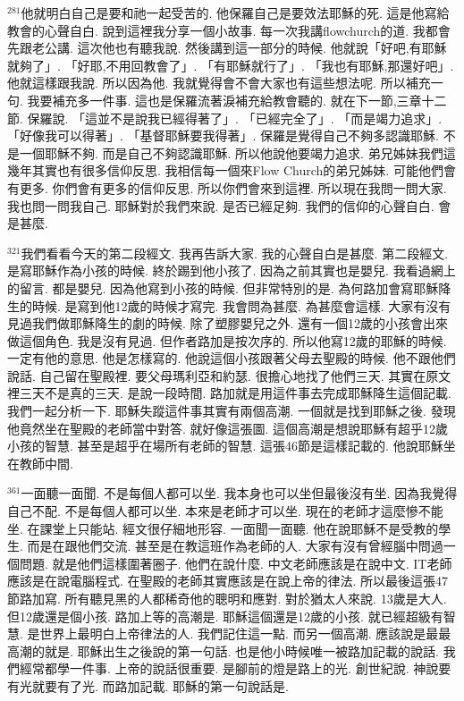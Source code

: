 \documentclass{book}
\begin{document}
$^{281}$他就明白自己是要和祂一起受苦的.
他保羅自己是要效法耶穌的死.
這是他寫給教會的心聲自白.
說到這裡我分享一個小故事.
每一次我講flowchurch的道.
我都會先跟老公講.
這次他也有聽我說.
然後講到這一部分的時候.
他就說「好吧,有耶穌就夠了」.
「好耶,不用回教會了」.
「有耶穌就行了」.
「我也有耶穌,那還好吧」.
他就這樣跟我說.
所以因為他.
我就覺得會不會大家也有這些想法呢.
所以補充一句.
我要補充多一件事.
這也是保羅流著淚補充給教會聽的.
就在下一節,三章十二節.
保羅說.
「這並不是說我已經得著了」.
「已經完全了」.
「而是竭力追求」.
「好像我可以得著」.
「基督耶穌要我得著」.
保羅是覺得自己不夠多認識耶穌.
不是一個耶穌不夠.
而是自己不夠認識耶穌.
所以他說他要竭力追求.
弟兄姊妹我們這幾年其實也有很多信仰反思.
我相信每一個來Flow Church的弟兄姊妹.
可能他們會有更多.
你們會有更多的信仰反思.
所以你們會來到這裡.
所以現在我問一問大家.
我也問一問我自己.
耶穌對於我們來說.
是否已經足夠.
我們的信仰的心聲自白.
會是甚麼.

$^{321}$我們看看今天的第二段經文.
我再告訴大家.
我的心聲自白是甚麼.
第二段經文.
是寫耶穌作為小孩的時候.
終於踢到他小孩了.
因為之前其實也是嬰兒.
我看過網上的留言.
都是嬰兒.
因為他寫到小孩的時候.
但非常特別的是.
為何路加會寫耶穌降生的時候.
是寫到他12歲的時候才寫完.
我會問為甚麼.
為甚麼會這樣.
大家有沒有見過我們做耶穌降生的劇的時候.
除了塑膠嬰兒之外.
還有一個12歲的小孩會出來做這個角色.
我是沒有見過.
但作者路加是按次序的.
所以他寫12歲的耶穌的時候.
一定有他的意思.
他是怎樣寫的.
他說這個小孩跟著父母去聖殿的時候.
他不跟他們說話.
自己留在聖殿裡.
要父母瑪利亞和約瑟.
很擔心地找了他們三天.
其實在原文裡三天不是真的三天.
是說一段時間.
路加就是用這件事去完成耶穌降生這個記載.
我們一起分析一下.
耶穌失蹤這件事其實有兩個高潮.
一個就是找到耶穌之後.
發現他竟然坐在聖殿的老師當中對答.
就好像這張圖.
這個高潮是想說耶穌有超乎12歲小孩的智慧.
甚至是超乎在場所有老師的智慧.
這張46節是這樣記載的.
他說耶穌坐在教師中間.

$^{361}$一面聽一面聞.
不是每個人都可以坐.
我本身也可以坐但最後沒有坐.
因為我覺得自己不配.
不是每個人都可以坐.
本來是老師才可以坐.
現在的老師才這麼慘不能坐.
在課堂上只能站.
經文很仔細地形容.
一面聞一面聽.
他在說耶穌不是受教的學生.
而是在跟他們交流.
甚至是在教這班作為老師的人.
大家有沒有曾經腦中問過一個問題.
就是他們這樣圍著圈子.
他們在說什麼.
中文老師應該是在說中文.
IT老師應該是在說電腦程式.
在聖殿的老師其實應該是在說上帝的律法.
所以最後這張47節路加寫.
所有聽見黑的人都稀奇他的聰明和應對.
對於猶太人來說.
13歲是大人.
但12歲還是個小孩.
路加上等的高潮是.
耶穌這個還是12歲的小孩.
就已經超級有智慧.
是世界上最明白上帝律法的人.
我們記住這一點.
而另一個高潮.
應該說是最最高潮的就是.
耶穌出生之後說的第一句話.
也是他小時候唯一被路加記載的說話.
我們經常都學一件事.
上帝的說話很重要.
是腳前的燈是路上的光.
創世紀說.
神說要有光就要有了光.
而路加記載.
耶穌的第一句說話是.
\end{document}
